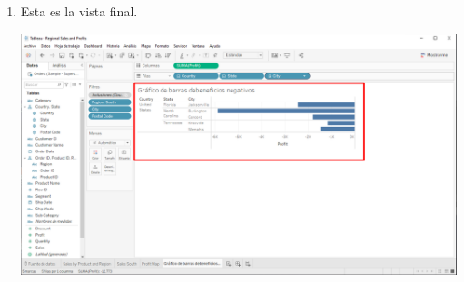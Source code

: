 \documentclass[12pt,letterpaper]{article}
\begin{document}
\begin{enumerate}
\begin{center}
        \end{center}
        \item Esta es la vista final.
        \begin{center}
            \includegraphics[width=15cm]{./img/img56.png}
        \end{center}
    \end{enumerate}
\end{document}

